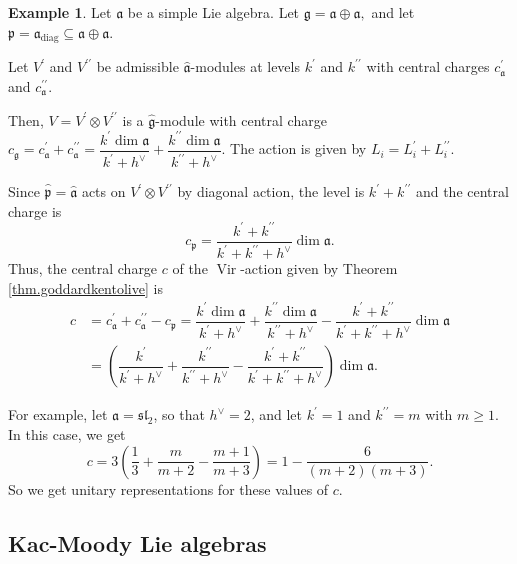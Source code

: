 \documentclass
[numbers=enddot,12pt,final,onecolumn,german,notitlepage]{scrartcl}%
\theoremstyle{definition}
\newtheorem{example}[theo]{Example}
\begin{document}
\begin{example}
Let $\mathfrak{a}$ be a simple Lie algebra. Let $\mathfrak{g}=\mathfrak{a}%
\oplus\mathfrak{a,}$ and let $\mathfrak{p}=\mathfrak{a}_{\operatorname*{diag}%
}\subseteq\mathfrak{a}\oplus\mathfrak{a}$.

Let $V^{\prime}$ and $V^{\prime\prime}$ be admissible $\widehat{\mathfrak{a}}%
$-modules at levels $k^{\prime}$ and $k^{\prime\prime}$ with central charges
$c_{\mathfrak{a}}^{\prime}$ and $c_{\mathfrak{a}}^{\prime\prime}$.

Then, $V=V^{\prime}\otimes V^{\prime\prime}$ is a $\widehat{\mathfrak{g}}%
$-module with central charge $c_{\mathfrak{g}}=c_{\mathfrak{a}}^{\prime
}+c_{\mathfrak{a}}^{\prime\prime}=\dfrac{k^{\prime}\dim\mathfrak{a}}%
{k^{\prime}+h^{\vee}}+\dfrac{k^{\prime\prime}\dim\mathfrak{a}}{k^{\prime
\prime}+h^{\vee}}$. The action is given by $L_{i}=L_{i}^{\prime}+L_{i}%
^{\prime\prime}$.

Since $\widehat{\mathfrak{p}}=\widehat{\mathfrak{a}}$ acts on $V^{\prime
}\otimes V^{\prime\prime}$ by diagonal action, the level is $k^{\prime
}+k^{\prime\prime}$ and the central charge is%
\[
c_{\mathfrak{p}}=\dfrac{k^{\prime}+k^{\prime\prime}}{k^{\prime}+k^{\prime
\prime}+h^{\vee}}\dim\mathfrak{a}.
\]
Thus, the central charge $c$ of the $\operatorname*{Vir}$-action given by
Theorem \ref{thm.goddardkentolive} is%
\begin{align*}
c  &  =c_{\mathfrak{a}}^{\prime}+c_{\mathfrak{a}}^{\prime\prime}%
-c_{\mathfrak{p}}=\dfrac{k^{\prime}\dim\mathfrak{a}}{k^{\prime}+h^{\vee}%
}+\dfrac{k^{\prime\prime}\dim\mathfrak{a}}{k^{\prime\prime}+h^{\vee}}%
-\dfrac{k^{\prime}+k^{\prime\prime}}{k^{\prime}+k^{\prime\prime}+h^{\vee}}%
\dim\mathfrak{a}\\
&  =\left(  \dfrac{k^{\prime}}{k^{\prime}+h^{\vee}}+\dfrac{k^{\prime\prime}%
}{k^{\prime\prime}+h^{\vee}}-\dfrac{k^{\prime}+k^{\prime\prime}}{k^{\prime
}+k^{\prime\prime}+h^{\vee}}\right)  \dim\mathfrak{a}.
\end{align*}


For example, let $\mathfrak{a}=\mathfrak{sl}_{2}$, so that $h^{\vee}=2$, and
let $k^{\prime}=1$ and $k^{\prime\prime}=m$ with $m\geq1$. In this case, we
get%
\[
c=3\left(  \dfrac{1}{3}+\dfrac{m}{m+2}-\dfrac{m+1}{m+3}\right)  =1-\dfrac
{6}{\left(  m+2\right)  \left(  m+3\right)  }.
\]
So we get unitary representations for these values of $c$.
\end{example}

\subsection{Kac-Moody Lie algebras}
\end{document}
